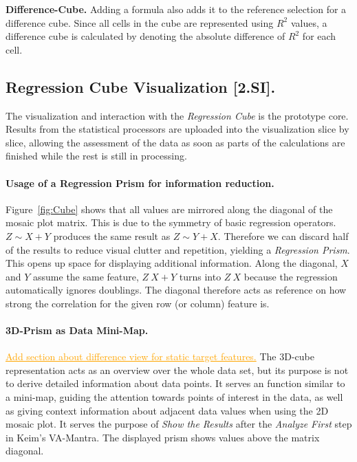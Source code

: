 \documentclass[journal]{style/vgtc} 			          %
\newcommand{\com}[1]{\textcolor{orange}{\uline{#1}}}
\begin{document}
\textbf{Difference-Cube.}
Adding a formula also adds it to the reference selection for a difference cube.
Since all cells in the cube are represented using $R^2$ values, a difference cube is calculated by denoting the absolute difference of $R^2$ for each cell.


\subsection{Regression Cube Visualization [2.SI].}
The visualization and interaction with the \emph{Regression Cube} is the prototype core.
Results from the statistical processors are uploaded into the visualization slice by slice, allowing the assessment of the data as soon as parts of the calculations are finished while the rest is still in processing.

\paragraph{Usage of a Regression Prism for information reduction.}
Figure~\ref{fig:Cube} shows that all values are mirrored along the diagonal of the mosaic plot matrix.
This is due to the symmetry of basic regression operators.
$Z \sim X + Y$ produces the same result as $Z \sim Y + X$.
Therefore we can discard half of the results to reduce visual clutter and repetition, yielding a \emph{Regression Prism}.
This opens up space for displaying additional information.
Along the diagonal, $X$ and $Y$ assume the same feature, $Z ~ X + Y$ turns into $Z ~ X$ because the regression automatically ignores doublings.
The diagonal therefore acts as reference on how strong the correlation for the given row (or column) feature is.

\paragraph{3D-Prism as Data Mini-Map.}
\com{Add section about difference view for static target features.}
The 3D-cube representation acts as an overview over the whole data set, but its purpose is not to derive detailed information about data points.
It serves an function similar to a mini-map, guiding the attention towards points of interest in the data, as well as giving context information about adjacent data values when using the 2D mosaic plot.
It serves the purpose of \emph{Show the Results} after the \emph{Analyze First} step in Keim's VA-Mantra.
The displayed prism shows values above the matrix diagonal.
\end{document}
